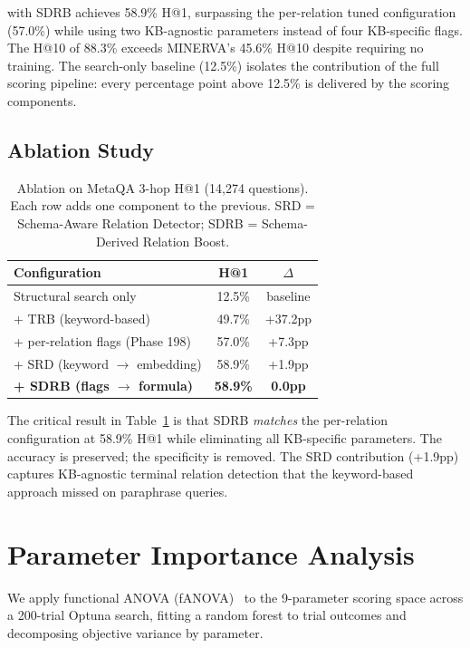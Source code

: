 \documentclass[10pt,twocolumn]{article}
\newcommand{\SDRB}{\textsc{SDRB}}
\newcommand{\SRD}{\textsc{SRD}}
\newcommand{\fanova}{f\textsc{ANOVA}}
\begin{document}
\CEREBRUM{} with \SDRB{} achieves 58.9\% H@1, surpassing the per-relation
tuned configuration (57.0\%) while using two KB-agnostic parameters instead
of four KB-specific flags. The H@10 of 88.3\% exceeds MINERVA's 45.6\%
H@10 despite requiring no training. The search-only baseline (12.5\%) isolates
the contribution of the full scoring pipeline: every percentage point above 12.5\%
is delivered by the scoring components.

\subsection{Ablation Study}

\begin{table}[h]
\centering
\caption{Ablation on MetaQA 3-hop H@1 (14,274 questions). Each row adds one
component to the previous. \SRD{} = Schema-Aware Relation Detector;
\SDRB{} = Schema-Derived Relation Boost.}
\label{tab:ablation}
\begin{tabular}{lcc}
\toprule
\textbf{Configuration} & \textbf{H@1} & \textbf{$\Delta$} \\
\midrule
Structural search only              & 12.5\% & baseline \\
+ TRB (keyword-based)               & 49.7\% & +37.2pp \\
+ per-relation flags (Phase 198)    & 57.0\% & +7.3pp \\
+ \SRD{} (keyword $\to$ embedding)  & 58.9\% & +1.9pp \\
\textbf{+ \SDRB{} (flags $\to$ formula)} & \textbf{58.9\%} & \textbf{0.0pp} \\
\bottomrule
\end{tabular}
\end{table}

The critical result in Table~\ref{tab:ablation} is that \SDRB{} \emph{matches}
the per-relation configuration at 58.9\% H@1 while eliminating all KB-specific
parameters. The accuracy is preserved; the specificity is removed.
The \SRD{} contribution (+1.9pp) captures KB-agnostic terminal relation
detection that the keyword-based approach missed on paraphrase queries.

\section{Parameter Importance Analysis}
\label{sec:fanova}

We apply functional ANOVA (\fanova{})~\cite{hutter2014fanova} to the
9-parameter scoring space across a 200-trial Optuna search, fitting a random
forest to trial outcomes and decomposing objective variance by parameter.
\end{document}
